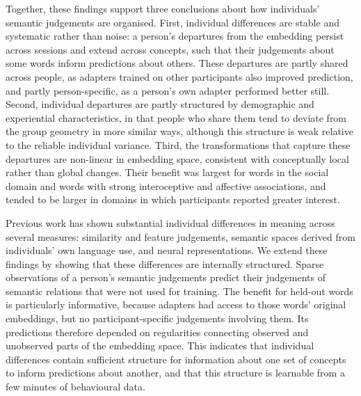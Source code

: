 \documentclass[pdflatex,sn-mathphys]{sn-jnl}
\begin{document}
Together, these findings support three conclusions about how individuals' semantic judgements are organised. First, individual differences are stable and systematic rather than noise: a person's departures from the embedding persist across sessions and extend across concepts, such that their judgements about some words inform predictions about others. These departures are partly shared across people, as adapters trained on other participants also improved prediction, and partly person-specific, as a person's own adapter performed better still. Second, individual departures are partly structured by demographic and experiential characteristics, in that people who share them tend to deviate from the group geometry in more similar ways, although this structure is weak relative to the reliable individual variance. Third, the transformations that capture these departures are non-linear in embedding space, consistent with conceptually local rather than global changes. Their benefit was largest for words in the social domain and words with strong interoceptive and affective associations, and tended to be larger in domains in which participants reported greater interest.

Previous work has shown substantial individual differences in meaning across several measures: similarity and feature judgements, semantic spaces derived from individuals' own language use, and neural representations\cite{Marti2023,Johns2024,Guitard2027,Charest2014,Wang2021}. We extend these findings by showing that these differences are internally structured. Sparse observations of a person's semantic judgements predict their judgements of semantic relations that were not used for training. The benefit for held-out words is particularly informative, because adapters had access to those words' original embeddings, but no participant-specific judgements involving them. Its predictions therefore depended on regularities connecting observed and unobserved parts of the embedding space. This indicates that individual differences contain sufficient structure for information about one set of concepts to inform predictions about another, and that this structure is learnable from a few minutes of behavioural data.
\end{document}
